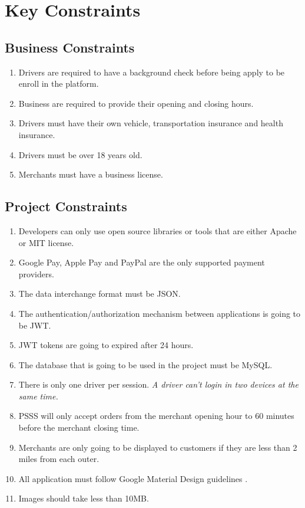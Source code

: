\section{Key Constraints}
\subsection{Business Constraints}
\begin{enumerate}[label=CON-\arabic*]
    \item Drivers are required to have a background check before being 
    apply to be enroll in the platform.
    \item Business are required to provide their opening and closing hours.
    \item Drivers must have their own vehicle, transportation insurance and 
    health insurance.
    \item Drivers must be over 18 years old.
    \item Merchants must have a business license.
\end{enumerate}
\subsection{Project Constraints}
\begin{enumerate}[resume, label=CON-\arabic*]
    \item Developers can only use open source libraries or tools that are 
    either Apache or MIT license.
    \item Google Pay, Apple Pay and PayPal are the only supported payment 
    providers.
    \item The data interchange format must be JSON.
    \item The authentication/authorization mechanism between applications 
    is going to be JWT.
    \item JWT tokens are going to expired after 24 hours.
    \item The database that is going to be used in the project must be MySQL.
    \item There is only one driver per session. \textit{A driver can't login 
    in two devices at the same time.}
    \item PSSS will only accept orders from the merchant opening hour to 60 
    minutes before the merchant closing time.
    \item Merchants are only going to be displayed to customers if they are 
    less than 2 miles from each outer.
    \item All application must follow Google Material Design 
    guidelines \cite{material-design-guidelines}.
    \item Images should take less than 10MB.
\end{enumerate}